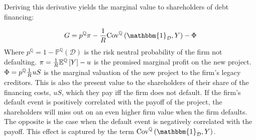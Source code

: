 \documentclass[../main.tex]{subfiles}
\begin{document}

        Deriving this derivative yields the marginal value to shareholders of debt financing:

            \begin{equation}
                G = 
                    p^{\mathbb{Q}}\pi 
                    - \discountfactor  \text{Cov}^{\mathbb{Q}}\left(\mathbbm{1}_{\mathcal{D}}, Y\right) - \Phi
                    \label{eqn:marginal-shareholder-value-debt-financing}
            \end{equation}
        Where $p^{\mathbb{Q}} = 1 - \mathbb{P}^{\mathbb{Q}}\left(\mathcal{D}\right)$ is the risk neutral probability of the firm not defaulting. 
        $\pi = \frac{1}{R} \mathbb{E}^{\mathbb{Q}}\left[Y\right] - u$ 
        is the promised marginal profit on the new project. 
        $\Phi = p^{\mathbb{Q}} \frac{1}{R} u S$
        is the marginal valuation of the new project to the firm's legacy creditors. 
        This is also the present value to the shareholders of their share of the financing costs, $uS$,
        which they pay iff the firm does not default. 
        If the firm's default event is positively correlated with the payoff of the project,
        the shareholders will miss out on an even higher firm value when the firm defaults.
        The opposite is the case when the default event is negatively correlated with the payoff.
        This effect is captured by the term 
        $\text{Cov}^{\mathbb{Q}}\left(\mathbbm{1}_{\mathcal{D}}, Y\right)$.
\end{document}
